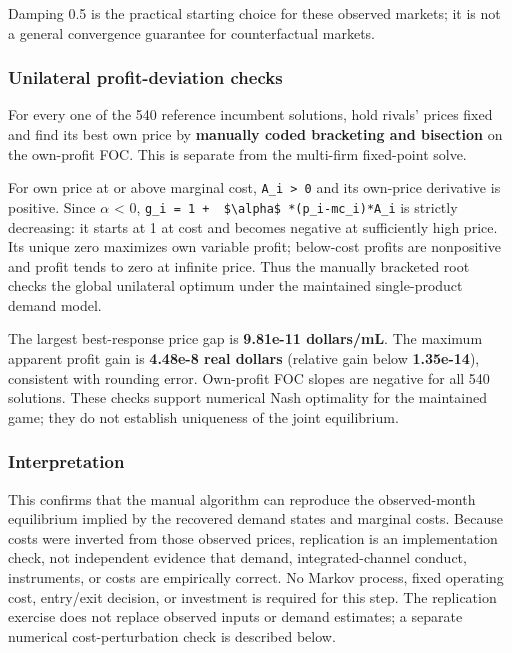 \documentclass[10pt,]{article}
\begin{document}
Damping 0.5 is the practical starting choice for these observed markets;
it is not a general convergence guarantee for counterfactual markets.

\subsubsection{Unilateral profit-deviation
checks}\label{unilateral-profit-deviation-checks}

For every one of the 540 reference incumbent solutions, hold rivals'
prices fixed and find its best own price by \textbf{manually coded
bracketing and bisection} on the own-profit FOC. This is separate from
the multi-firm fixed-point solve.

For own price at or above marginal cost,
\texttt{A\_i\ \textgreater{}\ 0} and its own-price derivative is
positive. Since \(\alpha\) \textless{} 0,
\texttt{g\_i\ =\ 1\ +\ \ \$\textbackslash{}alpha\$\ *(p\_i-mc\_i)*A\_i}
is strictly decreasing: it starts at 1 at cost and becomes negative at
sufficiently high price. Its unique zero maximizes own variable profit;
below-cost profits are nonpositive and profit tends to zero at infinite
price. Thus the manually bracketed root checks the global unilateral
optimum under the maintained single-product demand model.

The largest best-response price gap is \textbf{9.81e-11 dollars/mL}. The
maximum apparent profit gain is \textbf{4.48e-8 real dollars} (relative
gain below \textbf{1.35e-14}), consistent with rounding error.
Own-profit FOC slopes are negative for all 540 solutions. These checks
support numerical Nash optimality for the maintained game; they do not
establish uniqueness of the joint equilibrium.

\subsubsection{Interpretation}\label{interpretation}

This confirms that the manual algorithm can reproduce the observed-month
equilibrium implied by the recovered demand states and marginal costs.
Because costs were inverted from those observed prices, replication is
an implementation check, not independent evidence that demand,
integrated-channel conduct, instruments, or costs are empirically
correct. No Markov process, fixed operating cost, entry/exit decision,
or investment is required for this step. The replication exercise does
not replace observed inputs or demand estimates; a separate numerical
cost-perturbation check is described below.
\end{document}
